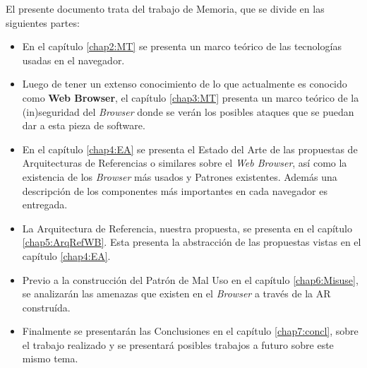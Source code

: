 El presente documento trata del trabajo de Memoria, que se divide en las siguientes partes:

\begin{itemize}
	\item En el capítulo \ref{chap2:MT} se presenta un marco teórico de las tecnologías usadas en el navegador.
	\item Luego de tener un extenso conocimiento de lo que actualmente es conocido como \textbf{Web Browser}, el capítulo \ref{chap3:MT} presenta un marco teórico de la (in)seguridad del \textit{Browser} donde se verán los posibles ataques que se puedan dar a esta pieza de software.
	\item En el capítulo \ref{chap4:EA} se presenta el Estado del Arte de las propuestas de Arquitecturas de Referencias o similares sobre el \textit{Web Browser}, así como la existencia de los \textit{Browser} más usados y Patrones existentes. Además una descripción de los componentes más importantes en cada navegador es entregada.
	\item La Arquitectura de Referencia, nuestra propuesta, se presenta en el capítulo \ref{chap5:ArqRefWB}. Esta presenta la abstracción de las propuestas vistas en el capítulo \ref{chap4:EA}.
	\item Previo a la construcción del Patrón de Mal Uso en el capítulo \ref{chap6:Misuse}, se analizarán las amenazas que existen en el \textit{Browser} a través de la AR construída. 
	\item Finalmente se presentarán las Conclusiones en el capítulo \ref{chap7:concl}, sobre el trabajo realizado y se presentará posibles trabajos a futuro sobre este mismo tema.
\end{itemize}












